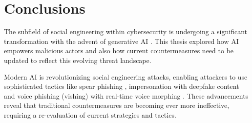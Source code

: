 



\chapter{Conclusions\label{chapter:conclusions}}

\begin{comment}

Guides:
    - 1 to 3 pages max?
    - No subsections

TODO:
    [ ] How AI has augmented SE attacks and countermeasures
    [ ] Gap in the literature

What to cover:
    - How AI has augmented SE attacks and countermeasures
    - Gap in the literature regarding SE and AI intersection?
    - Analysis on where AI-powered SE attacks might be headed in the future
        - Also about robotics and human-like actors
    - What organizations and individuals need to do regarding the evolving landscape of SE attacks

Speculation:
    - Drones dropping USB thumbdrives?
    - Human-like android as threat actors
    - Impact of robotics on dumpster diving, shoulder surfing and baiting
    
From training material:
    - "Yhteenveto vaatimattomimmillaan on vain lyhyt kertaus kirjoituksen keskeisistä asioista. Arvokkaamman yhteenvedon saa aikaan kommentoimalla työn tulosten arvoa, työn liittymistä ympäristöön ja tulevaisuudennäkymiä. Tällaiset arviot huolellisesti perusteltava."
    - "Yhteenvetoluku kuvaa teknisten johtopäätösten tuomaa impaktia."

\end{comment}

The subfield of social engineering within cybersecurity is undergoing a significant transformation with the advent of generative AI \citep{fakhouriAIDrivenSolutionsForSocialEngineeringAttacks2024}. This thesis explored how AI empowers malicious actors and also how current countermeasures need to be updated to reflect this evolving threat landscape.

Modern AI is revolutionizing social engineering attacks, enabling attackers to use sophisticated tactics like spear phishing \citep{basitComprehensiveSurveyAIenabledPhishingAttacks2021}, impersonation with deepfake content \citep{mirskyTheCreationAndDetectionOfDeepfakes2021} and voice phishing (vishing) with real-time voice morphing \citep{doanBTSEAudioDeepfakeDetectiong2023}. These advancements reveal that traditional countermeasures are becoming ever more ineffective, requiring a re-evaluation of current strategies and tactics.

